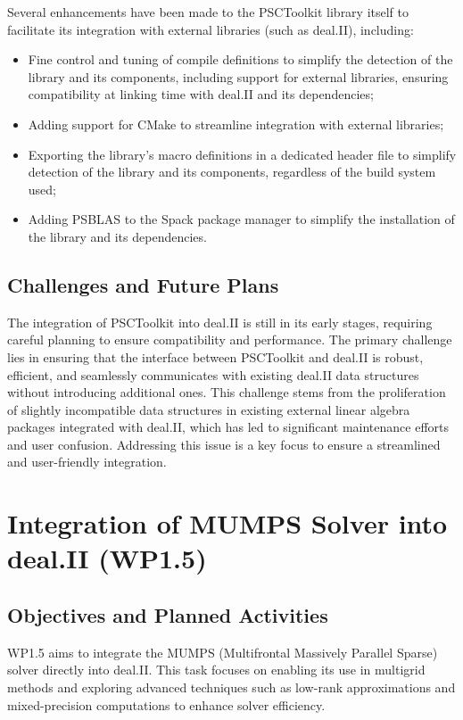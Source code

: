 \documentclass[a4paper,12pt]{article}
\begin{document}
        Several enhancements have been made to the PSCToolkit library itself to facilitate its integration with external libraries (such as deal.II), including:
        \begin{itemize}
            \item Fine control and tuning of compile definitions to simplify the detection of the library and its components, including support for external libraries, ensuring compatibility at linking time with deal.II and its dependencies;
            \item Adding support for CMake to streamline integration with external libraries;
            \item Exporting the library's macro definitions in a dedicated header file to simplify detection of the library and its components, regardless of the build system used;
            \item Adding PSBLAS to the Spack package manager to simplify the installation of the library and its dependencies.
        \end{itemize}

        \subsection{Challenges and Future Plans}

        The integration of PSCToolkit into deal.II is still in its early stages, requiring careful planning to ensure compatibility and performance. The primary challenge lies in ensuring that the interface between PSCToolkit and deal.II is robust, efficient, and seamlessly communicates with existing deal.II data structures without introducing additional ones. This challenge stems from the proliferation of slightly incompatible data structures in existing external linear algebra packages integrated with deal.II, which has led to significant maintenance efforts and user confusion. Addressing this issue is a key focus to ensure a streamlined and user-friendly integration.

\section{Integration of MUMPS Solver into deal.II (WP1.5)}
    \subsection{Objectives and Planned Activities}
    WP1.5 aims to integrate the MUMPS (Multifrontal Massively Parallel Sparse) solver directly into deal.II. This task focuses on enabling its use in multigrid methods and exploring advanced techniques such as low-rank approximations and mixed-precision computations to enhance solver efficiency.
\end{document}
